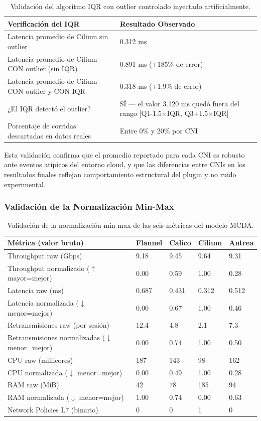 \begin{table}[htbp]
\centering
\scriptsize
\begin{tabularx}{\textwidth}{|Y|Y|}
\hline
\textbf{Verificación del IQR} & \textbf{Resultado Observado} \\
\hline
Latencia promedio de Cilium sin outlier & 0.312 ms \\
Latencia promedio de Cilium CON outlier (sin IQR) & 0.891 ms (+185\% de error) \\
Latencia promedio de Cilium CON outlier y CON IQR & 0.318 ms (+1.9\% de error) \\
¿El IQR detectó el outlier? & SÍ --- el valor 3.120 ms quedó fuera del rango [Q1-1.5$\times$IQR, Q3+1.5$\times$IQR] \\
Porcentaje de corridas descartadas en datos reales & Entre 0\% y 20\% por CNI \\
\hline
\end{tabularx}
\caption{Validación del algoritmo IQR con outlier controlado inyectado artificialmente.}
\end{table}

Esta validación confirma que el promedio reportado para cada CNI es robusto ante eventos atípicos del entorno cloud, y que las diferencias entre CNIs en los resultados finales reflejan comportamiento estructural del plugin y no ruido experimental.

\subsubsection{Validación de la Normalización Min-Max}

\begin{table}[htbp]
\centering
\scriptsize
\begin{tabularx}{\textwidth}{|Y|Y|Y|Y|Y|}
\hline
\textbf{Métrica (valor bruto)} & \textbf{Flannel} & \textbf{Calico} & \textbf{Cilium} & \textbf{Antrea} \\
\hline
Throughput raw (Gbps) & 9.18 & 9.45 & 9.64 & 9.31 \\
Throughput normalizado ($\uparrow$ mayor=mejor) & 0.00 & 0.59 & 1.00 & 0.28 \\
Latencia raw (ms) & 0.687 & 0.431 & 0.312 & 0.512 \\
Latencia normalizada ($\downarrow$ menor=mejor) & 0.00 & 0.67 & 1.00 & 0.46 \\
Retransmisiones raw (por sesión) & 12.4 & 4.8 & 2.1 & 7.3 \\
Retransmisiones normalizadas ($\downarrow$ menor=mejor) & 0.00 & 0.74 & 1.00 & 0.50 \\
CPU raw (millicores) & 187 & 143 & 98 & 162 \\
CPU normalizada ($\downarrow$ menor=mejor) & 0.00 & 0.49 & 1.00 & 0.28 \\
RAM raw (MiB) & 42 & 78 & 185 & 94 \\
RAM normalizada ($\downarrow$ menor=mejor) & 1.00 & 0.74 & 0.00 & 0.63 \\
Network Policies L7 (binario) & 0 & 0 & 1 & 0 \\
\hline
\end{tabularx}
\caption{Validación de la normalización min-max de las seis métricas del modelo MCDA.}
\end{table}

